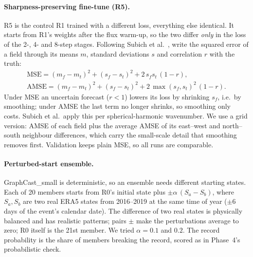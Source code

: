 \documentclass{article}
\newcommand{\R}[1]{\textsf{R#1}}
\begin{document}
\paragraph{Sharpness-preserving fine-tune (\R{5}).}
\R{5} is the control \R{1} trained with a different loss, everything else identical. It starts from \R{1}'s weights after the flux warm-up,
so the two differ \emph{only} in the loss of the 2-, 4- and 8-step stages. Following Subich et al.~\cite{subich2025amse}, write the squared error of a field
through its means $m$, standard deviations $s$ and correlation $r$ with the truth:
\begin{gather*}
\mathrm{MSE} = (m_f-m_t)^2 + (s_f-s_t)^2 + 2\,s_f s_t\,(1-r),\\
\mathrm{AMSE} = (m_f-m_t)^2 + (s_f-s_t)^2 + 2\,\max(s_f,s_t)^2\,(1-r).
\end{gather*}
Under MSE an uncertain forecast ($r<1$) lowers its loss by shrinking $s_f$, i.e.\ by smoothing; under AMSE the last term no longer shrinks, so smoothing only costs.
Subich et al.\ apply this per spherical-harmonic wavenumber. We use a grid version: AMSE of each field plus the average AMSE of its east--west and north--south
neighbour differences, which carry the small-scale detail that smoothing removes first. Validation keeps plain MSE, so all runs are comparable.

\paragraph{Perturbed-start ensemble.}
GraphCast\_small is deterministic, so an ensemble needs different starting states. Each of 20 members starts from \R{0}'s initial state plus
$\pm\alpha\,(S_a - S_b)$, where $S_a, S_b$ are two real ERA5 states from 2016--2019 at the same time of year ($\pm6$ days of the event's calendar date). The difference of two real states
is physically balanced and has realistic patterns; pairs $\pm$ make the perturbations average to zero; \R{0} itself is the 21st member.
We tried $\alpha = 0.1$ and $0.2$. The record probability is the share of members breaking the record, scored as in Phase~4's probabilistic check.
\end{document}

